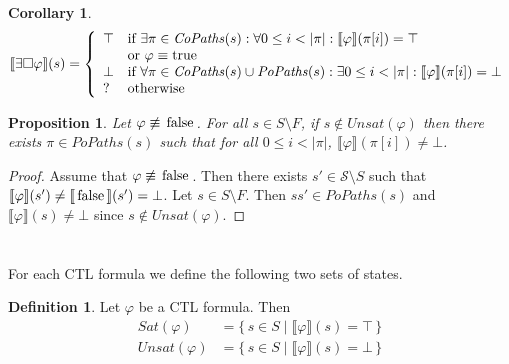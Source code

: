 \documentclass[12pt]{article}
\newcommand{\always}{\Box}
\newcommand{\TRUE}{\mbox{\lstinline{true}}}
\newcommand{\FALSE}{\mbox{\lstinline{false}}}
\newtheorem{proposition}{Proposition}
\newtheorem{corollary}{Corollary}
\theoremstyle{definition}
\newtheorem{definition}{Definition}
\newcommand{\satisfaction}[1]{\llbracket #1 \rrbracket}
\newcommand{\bottom}{\mathord{\perp}}
\newenvironment{franck}{\color{red}}{\color{black}}
\begin{document}
\begin{franck}
\begin{corollary}
\[
\satisfaction{\exists \always \varphi}(s) = \left \{
\begin{array}{ll}
\top & \mbox{if $\exists \pi \in \mathit{CoPaths}(s) : \forall 0 \leq i < |\pi| : \satisfaction{\varphi}(\pi[i]) = \top$}\\
& \mbox{or $\varphi \equiv \TRUE$}\\
\bottom & \mbox{if $\forall \pi \in \mathit{CoPaths}(s) \cup \mathit{PoPaths}(s) : \exists 0 \leq i < |\pi| : \satisfaction{\varphi}(\pi[i]) = \bottom$}\\
? & \mbox{otherwise}
\end{array}
\right .
\]
\end{corollary}

\begin{proposition}
\label{proposition:exists-always-not-fully-explored}
Let $\varphi \not\equiv \FALSE$.  For all $s \in S \setminus F$, if $s \not\in \mathit{Unsat}(\varphi)$ then there exists $\pi \in \mathit{PoPaths}(s)$ such that for all $0 \leq i < |\pi|$, $\satisfaction{\varphi}(\pi[i]) \not= \bottom$.
\end{proposition}
\begin{proof}
Assume that $\varphi \not\equiv \FALSE$.  Then there exists $s' \in \mathcal{S} \setminus S$ such that $\satisfaction{\varphi}(s') \not= \satisfaction{\FALSE}(s') = \bottom$.  Let $s \in S \setminus F$.  Then $s s' \in \mathit{PoPaths}(s)$ and $\satisfaction{\varphi}(s) \not= \bottom$ since $s \not\in \mathit{Unsat}(\varphi)$.
\end{proof}
\end{franck}

\section{}

For each CTL formula we define the following two sets of states.

\begin{definition}
Let $\varphi$ be a CTL formula.  Then
\begin{align*}
\mathit{Sat}(\varphi) & = \{\, s \in S \mid \satisfaction{\varphi}(s) = \top \,\}\\
\mathit{Unsat}(\varphi) & = \{\, s \in S \mid \satisfaction{\varphi}(s) = \bottom \,\}
\end{align*}
\end{definition}
\end{document}
